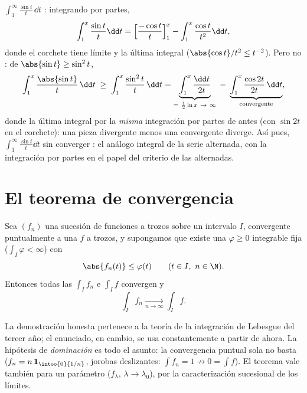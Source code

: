 \begin{example}\label{ex:b2:integration:sint}
$\displaystyle\int_1^{\infty} \frac{\sin t}{t}\,\dd t$ :
integrando por partes,
\[
\int_1^x \frac{\sin t}{t}\dd t
= \Bigl[\frac{-\cos t}{t}\Bigr]_1^x - \int_1^x \frac{\cos
t}{t^2}\dd t ,
\]
donde el corchete tiene límite y la última integral 
 ($\abs{\cos t}/t^2 \leq t^{-2}$). Pero no
: de $\abs{\sin t} \geq \sin^2 t$,
\[
\int_1^x \frac{\abs{\sin t}}{t}\,\dd t
\;\geq\; \int_1^x \frac{\sin^2t}{t}\,\dd t
= \underbrace{\int_1^x \frac{\dd t}{2t}}_{=\ \frac12\ln x
\ \to\ \infty}
\;-\; \underbrace{\int_1^x \frac{\cos 2t}{2t}\,\dd
t}_{\text{convergente}} ,
\]
donde la última integral  por la \emph{misma} integración
por partes de antes (con $\sin 2t$ en el corchete): una pieza
divergente menos una convergente diverge. Así pues,
$\int_1^\infty\frac{\sin t}{t}\dd t$  sin converger
: el análogo integral de la serie alternada, con la
integración por partes en el papel del criterio de las alternadas.
\end{example}

\section{El teorema de convergencia}

\begin{theorem}\label{thm:b2:integration:dominated}
Sea $(f_n)$ una sucesión de funciones  a trozos sobre un
intervalo $I$, convergente puntualmente a una $f$  a
trozos, y supongamos que existe una $\varphi \geq 0$ integrable fija
($\int_I \varphi < \infty$) con
\[
\abs{f_n(t)} \leq \varphi(t) \qquad (t \in I,\ n \in \N).
\]
Entonces todas las $\int_I f_n$ e $\int_I f$ convergen
 y
\[
\int_I f_n \xrightarrow[n \to \infty]{} \int_I f .
\]
\end{theorem}
\admitted

\begin{remark}
La demostración honesta pertenece a la teoría de la integración de
Lebesgue del tercer año; el enunciado, en cambio, se usa
constantemente a partir de ahora. La hipótesis de \emph{dominación}
es todo el asunto: la convergencia puntual sola no basta ($f_n =
n\,\mathbf{1}_{\intoo{0}{1/n}}$, jorobas deslizantes: $\int f_n = 1
\not\to 0 = \int f$). El teorema vale también para un parámetro
 ($f_\lambda$, $\lambda \to \lambda_0$), por la
caracterización sucesional de los límites.
\end{remark}

